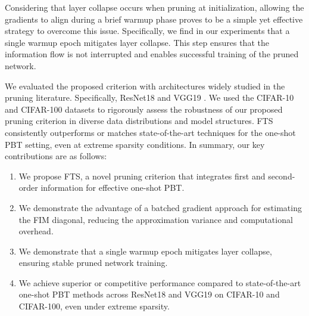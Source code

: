 Considering that layer collapse occurs when pruning at initialization, allowing the gradients to align during a brief warmup phase proves to be a simple yet effective strategy to overcome this issue. Specifically, we find in our experiments that a single warmup epoch mitigates layer collapse. This step ensures that the information flow is not interrupted and enables successful training of the pruned network.

We evaluated the proposed criterion with architectures widely studied in the pruning literature. Specifically, ResNet18 \cite{he2016deep} and VGG19 \cite{simonyan2014very}. We used the CIFAR-10 and CIFAR-100 datasets \cite{krizhevsky2009learning} to rigorously assess the robustness of our proposed pruning criterion in diverse data distributions and model structures. FTS consistently outperforms or matches state-of-the-art techniques for the one-shot PBT setting, even at extreme sparsity conditions. In summary, our key contributions are as follows:

\begin{enumerate}
    \item We propose FTS, a novel pruning criterion that integrates first and second-order information for effective one-shot PBT.
    \item We demonstrate the advantage of a batched gradient approach for estimating the FIM diagonal, reducing the approximation variance and computational overhead.
    \item We demonstrate that a single warmup epoch mitigates layer collapse, ensuring stable pruned network training.
    \item We achieve superior or competitive performance compared to state-of-the-art one-shot PBT methods across ResNet18 and VGG19 on CIFAR-10 and CIFAR-100, even under extreme sparsity.
\end{enumerate}

